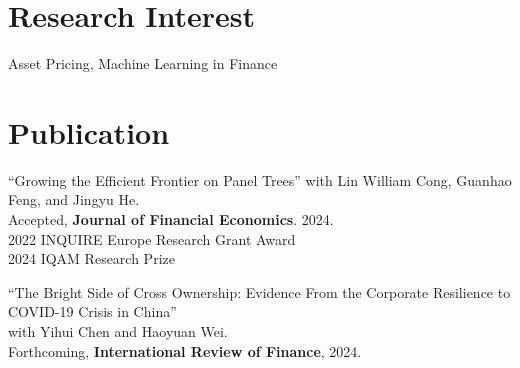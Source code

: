 \documentclass{clean_cv}
\begin{document}
\section{Research Interest}
\begin{center}
	Asset Pricing, Machine Learning in Finance
\end{center}

\section{Publication}

\begin{etaremune}
	\setlength\itemsep{1.0em}
	

	\item “Growing the Efficient Frontier on Panel Trees” 
	with Lin William Cong, Guanhao Feng, and Jingyu He. 
	\href{https://papers.ssrn.com/sol3/papers.cfm?abstract_id=3949463}{ \color{orange} }	\\
		Accepted, \textbf{Journal of Financial Economics}. 2024. \\
		2022 INQUIRE Europe Research Grant Award \\
		2024 IQAM Research Prize
			
	\item “The Bright Side of Cross Ownership: Evidence From the Corporate Resilience to COVID-19 Crisis in China” 
	\href{https://onlinelibrary.wiley.com/doi/abs/10.1111/irfi.12468}{ \color{orange} } \\
	with Yihui Chen and Haoyuan Wei. \\
	Forthcoming, \textbf{International Review of Finance}, 2024.
	
\end{etaremune}


\end{document}
